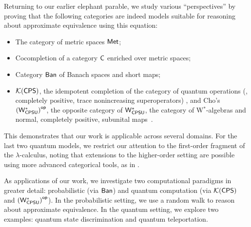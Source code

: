 Returning to our earlier elephant parable, we study various ``perspectives” by proving that the following categories are indeed models suitable for reasoning about approximate equivalence using this equation:
\begin{itemize}
\item The category of metric spaces $\mathsf{Met}$;
\item Cocompletion of a category $\mathsf{C}$ enriched over metric spaces;
\item Category $ \mathsf{Ban} $ of Banach spaces and short maps;
\item  \( \mathcal{K}{(\mathsf{CPS})} \), the idempotent completion of the category of quantum operations (\ie, completely positive, trace nonincreasing superoperators) \cite{selinger2004towards}, and Cho’s \( \left(\mathsf{W^*_{CPSU}}\right)^{\mathsf{op}} \), the opposite category of \( \mathsf{W^*_{CPSU}} \), the category of W$^*$-algebras and normal, completely positive, subunital maps~\cite{choSemanticsQuantumProgramming2016}.
\end{itemize}
This demonstrates that our work is applicable across several domains. For the last two quantum models, we restrict our attention to the first-order fragment of the $\lambda$-calculus, noting that extensions to the higher-order setting are possible using more advanced categorical tools, as in \cite{dahlqvist2023syntactic}.

As applications of our work, we investigate two computational paradigms in greater detail: probabilistic (via $\mathsf{Ban}$) and quantum computation (via $\mathcal{K}{(\mathsf{CPS})}$ and $\left(\mathsf{W^*_{CPSU}}\right)^{\mathsf{op}}$). In the probabilistic setting, we use a random walk to reason about approximate equivalence. In the quantum setting, we explore two examples: quantum state discrimination and quantum teleportation.
 



